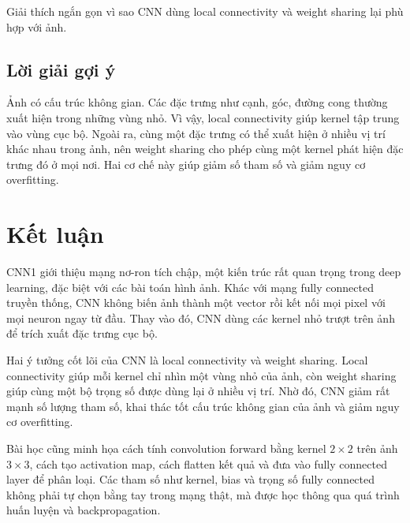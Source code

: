 \documentclass[12pt,a4paper]{report}
\begin{document}
Giải thích ngắn gọn vì sao CNN dùng local connectivity và weight sharing lại phù hợp với ảnh.

\section*{Lời giải gợi ý}

Ảnh có cấu trúc không gian. Các đặc trưng như cạnh, góc, đường cong thường xuất hiện trong những vùng nhỏ. Vì vậy, local connectivity giúp kernel tập trung vào vùng cục bộ. Ngoài ra, cùng một đặc trưng có thể xuất hiện ở nhiều vị trí khác nhau trong ảnh, nên weight sharing cho phép cùng một kernel phát hiện đặc trưng đó ở mọi nơi. Hai cơ chế này giúp giảm số tham số và giảm nguy cơ overfitting.

\chapter*{Kết luận}

CNN1 giới thiệu mạng nơ-ron tích chập, một kiến trúc rất quan trọng trong deep learning, đặc biệt với các bài toán hình ảnh. Khác với mạng fully connected truyền thống, CNN không biến ảnh thành một vector rồi kết nối mọi pixel với mọi neuron ngay từ đầu. Thay vào đó, CNN dùng các kernel nhỏ trượt trên ảnh để trích xuất đặc trưng cục bộ.

Hai ý tưởng cốt lõi của CNN là local connectivity và weight sharing. Local connectivity giúp mỗi kernel chỉ nhìn một vùng nhỏ của ảnh, còn weight sharing giúp cùng một bộ trọng số được dùng lại ở nhiều vị trí. Nhờ đó, CNN giảm rất mạnh số lượng tham số, khai thác tốt cấu trúc không gian của ảnh và giảm nguy cơ overfitting.

Bài học cũng minh họa cách tính convolution forward bằng kernel $2\times2$ trên ảnh $3\times3$, cách tạo activation map, cách flatten kết quả và đưa vào fully connected layer để phân loại. Các tham số như kernel, bias và trọng số fully connected không phải tự chọn bằng tay trong mạng thật, mà được học thông qua quá trình huấn luyện và backpropagation.
\end{document}
